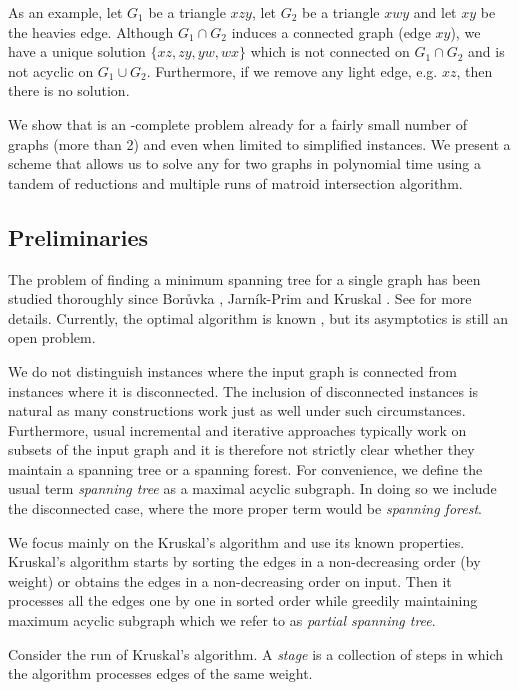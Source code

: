 As an example, let $G_1$ be a triangle $xzy$, let $G_2$ be a triangle $xwy$ and let $xy$ be the heavies edge. Although $G_1 \cap G_2$ induces a connected graph (edge $xy$), we have a unique solution $\{xz,zy,yw,wx\}$ which is not connected on $G_1 \cap G_2$ and is not acyclic on $G_1 \cup G_2$. Furthermore, if we remove any light edge, e.g. $xz$, then there is no solution. 

We show that \SMST is an \NP-complete problem already for a fairly small number of graphs (more than 2) and even when limited to simplified instances. We present a scheme that allows us to solve any \SMST for two graphs in polynomial time using a tandem of reductions and multiple runs of matroid intersection algorithm. 

\subsection{Preliminaries}
The problem of finding a minimum spanning tree for a single graph has been studied thoroughly since Bor\r uvka \cite{b:boruvka}, Jarn\' ik-Prim \cite{b:jarnik}\cite{b:prim} and Kruskal \cite{b:kruskal}. See \cite{b:mst} for more details. Currently, the optimal algorithm is known \cite{b:mstopt}, but its asymptotics is still an open problem. 

We do not distinguish instances where the input graph is connected from instances where it is disconnected. The inclusion of disconnected instances is natural as many constructions work just as well under such circumstances. Furthermore, usual incremental and iterative approaches typically work on subsets of the input graph and it is therefore not strictly clear whether they maintain a spanning tree or a spanning forest. For convenience, we define the usual term {\em spanning tree} as a maximal acyclic subgraph. In doing so we include the disconnected case, where the more proper term would be {\em spanning forest}. 

We focus mainly on the Kruskal's algorithm and use its known properties. Kruskal's algorithm starts by sorting the edges in a non-decreasing order (by weight) or obtains the edges in a non-decreasing order on input. Then it processes all the edges one by one in sorted order while greedily maintaining maximum acyclic subgraph which we refer to as {\em partial spanning tree}. 

\begin{definition}
Consider the run of Kruskal's algorithm. A {\em stage} is a collection of steps in which the algorithm processes edges of the same weight. 
\end{definition}

